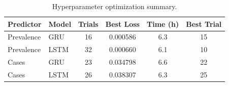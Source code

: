 \begin{table}[t]
\centering
\caption{Hyperparameter optimization summary.}
\label{tab:optimization_summary}
\begin{tabular}{llS[table-format=3.0]S[table-format=1.6]S[table-format=2.1]S[table-format=3.0]}
\toprule
\textbf{Predictor} & \textbf{Model} & \textbf{Trials} & \textbf{Best Loss} & \textbf{Time (h)} & \textbf{Best Trial}\\
\midrule
Prevalence & GRU & 16 & 0.000586 & 6.3 & 15\\
Prevalence & LSTM & 32 & 0.000660 & 6.1 & 10\\
Cases & GRU & 23 & 0.034798 & 6.6 & 22\\
Cases & LSTM & 26 & 0.038307 & 6.3 & 25\\
\bottomrule
\end{tabular}
\end{table}